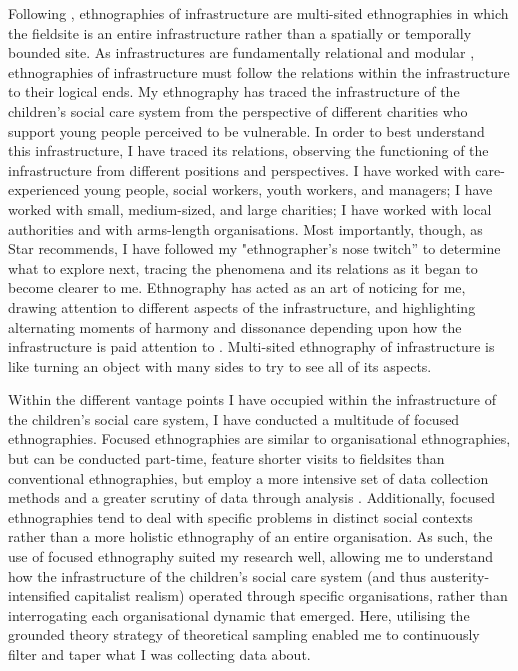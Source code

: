 Following \citet{star_ethnography_1999}, ethnographies of infrastructure are multi-sited ethnographies in which the fieldsite is an entire infrastructure rather than a spatially or temporally bounded site. As infrastructures are fundamentally relational and modular \citep{star_steps_1996}, ethnographies of infrastructure must follow the relations within the infrastructure to their logical ends. My ethnography has traced the infrastructure of the children’s social care system from the perspective of different charities who support young people perceived to be vulnerable. In order to best understand this infrastructure, I have traced its relations, observing the functioning of the infrastructure from different positions and perspectives. I have worked with care-experienced young people, social workers, youth workers, and managers; I have worked with small, medium-sized, and large charities; I have worked with local authorities and with arms-length organisations. Most importantly, though, as Star recommends, I have followed my "ethnographer’s nose twitch” \citep[610]{leigh_star_this_2010} to determine what to explore next, tracing the phenomena and its relations as it began to become clearer to me. Ethnography has acted as an art of noticing for me, drawing attention to different aspects of the infrastructure, and highlighting alternating moments of harmony and dissonance depending upon how the infrastructure is paid attention to \citep[24]{tsing_mushroom_2017}. Multi-sited ethnography of infrastructure is like turning an object with many sides to try to see all of its aspects.  

Within the different vantage points I have occupied within the infrastructure of the children's social care system, I have conducted a multitude of focused ethnographies. Focused ethnographies are similar to organisational ethnographies, but can be conducted part-time, feature shorter visits to fieldsites than conventional ethnographies, but employ a more intensive set of data collection methods and a greater scrutiny of data through analysis \citep{knoblauch_focused_2005}. Additionally, focused ethnographies tend to deal with specific problems in distinct social contexts \citep{wall_focused_2014} rather than a more holistic ethnography of an entire organisation. As such, the use of focused ethnography suited my research well, allowing me to understand how the infrastructure of the children's social care system (and thus austerity-intensified capitalist realism) operated through specific organisations, rather than interrogating each organisational dynamic that emerged. Here, utilising the grounded theory strategy of theoretical sampling \citep[96]{charmaz_constructing_2006} enabled me to continuously filter and taper what I was collecting data about. 


